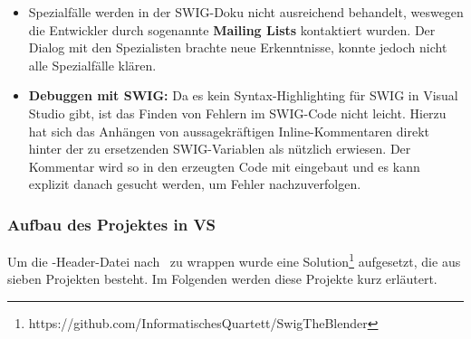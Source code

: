 \begin{itemize}
\begin{itemize}
	\end{itemize}
\item Spezialfälle werden in der SWIG-Doku nicht ausreichend behandelt, weswegen die Entwickler durch sogenannte \textbf{Mailing Lists} kontaktiert wurden. Der Dialog mit den Spezialisten brachte neue Erkenntnisse, konnte jedoch nicht alle Spezialfälle klären. %
\item \textbf{Debuggen mit SWIG:} Da es kein Syntax-Highlighting für SWIG in Visual Studio gibt, ist das Finden von Fehlern im SWIG-Code nicht leicht. Hierzu hat sich das Anhängen von aussagekräftigen Inline-Kommentaren direkt hinter der zu ersetzenden SWIG-Variablen als nützlich erwiesen. Der Kommentar wird so in den erzeugten Code mit eingebaut und es kann explizit danach gesucht werden, um Fehler nachzuverfolgen.
\end{itemize}

\subsubsection{Aufbau des Projektes in VS}\label{subsubsec:Aufbau}

Um die \CC-Header-Datei nach \CS~zu wrappen wurde eine Solution\footnote{https://github.com/InformatischesQuartett/SwigTheBlender} aufgesetzt, die aus sieben Projekten besteht. Im Folgenden werden diese Projekte kurz erläutert.\\

